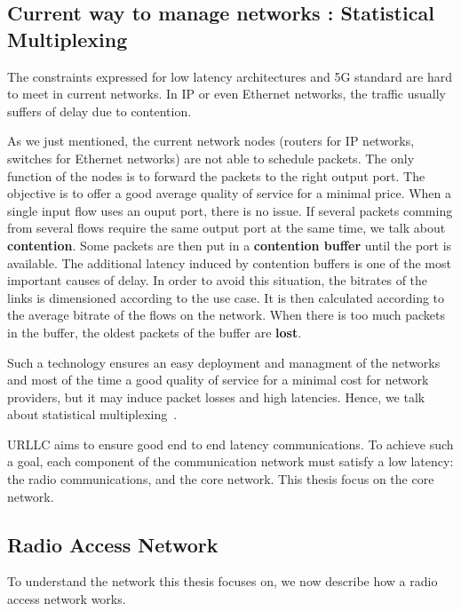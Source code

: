 \subsection{Current way to manage networks : Statistical Multiplexing}


The constraints expressed for low latency architectures and 5G standard are hard to meet in current networks. In IP or even Ethernet networks, the traffic usually suffers of delay due to contention. 

As we just mentioned, the current network nodes (routers for IP networks, switches for Ethernet networks) are not able to schedule packets. The only function of the nodes is to forward the packets to the right output port.
The objective is to offer a good average quality of service for a minimal price. When a single input flow uses an ouput port, there is no issue.
 If several packets comming from several flows require the same output port at the same time, we talk about \textbf{contention}. Some packets are then put in a \textbf{contention buffer} until the port is available. The additional latency induced by contention buffers is one of the most important causes of delay. In order to avoid this situation, the bitrates of the links is dimensioned according to the use case. It is then calculated according to the average bitrate of the flows on the network. 
 When there is too much packets in the buffer, the oldest packets of the buffer are \textbf{lost}. 

Such a technology ensures an easy deployment and managment of the networks and most of the time a good quality of service for a minimal cost for network providers, but it may induce packet losses and high latencies. Hence, we talk about statistical multiplexing~\cite{krishnamurthy2003latency,venkatramani1994supporting}. 

URLLC aims to ensure good end to end latency communications. To achieve such a goal, each component of the communication network must satisfy a low latency: the radio communications, and the core network. This thesis focus on the core network. 

\subsection{\textbf{R}adio \textbf{A}ccess \textbf{N}etwork}

To understand the network this thesis focuses on, we now describe how a radio access network works.

